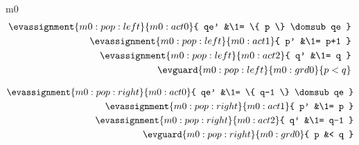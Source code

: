\documentclass[12pt]{amsart}
\begin{document}
\begin{machine}{m0}
\begin{align*}
\evassignment{m0:pop:left}{m0:act0}{ qe' &\1= \{ p \} \domsub qe }
\\ \evassignment{m0:pop:left}{m0:act1}{ p' &\1= p+1 }
\\ \evassignment{m0:pop:left}{m0:act2}{ q' &\1= q }
\\ \evguard{m0:pop:left}{m0:grd0}{ p < q }
\end{align*}


\begin{align*}
\evassignment{m0:pop:right}{m0:act0}{ qe' &\1= \{ q-1 \} \domsub qe }
\\ \evassignment{m0:pop:right}{m0:act1}{ p' &\1= p }
\\ \evassignment{m0:pop:right}{m0:act2}{ q' &\1= q-1 }
\\ \evguard{m0:pop:right}{m0:grd0}{ p &< q }
\end{align*}

\end{machine}

\newcommand{\REQ}{\text{REQ}}
\end{document}
